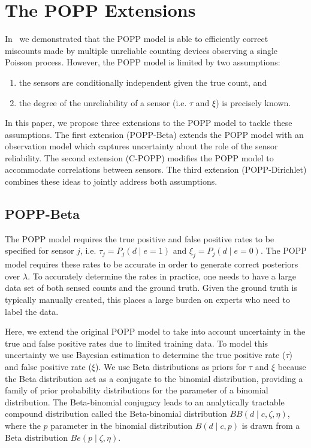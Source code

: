 
\section{The POPP Extensions}
\label{sec:popp_extensions}

In~\cite{jovan18a} we demonstrated that the POPP model is able to efficiently correct miscounts made by multiple unreliable counting devices observing a single Poisson process. However, the POPP model is limited by two assumptions:
\begin{enumerate}
	\item the sensors are conditionally independent given the true count, and 
	\item the degree of the unreliability of a sensor (i.e. $\tau$ and $\xi$) is precisely known.
\end{enumerate}
In this paper, we propose three extensions to the POPP model to tackle these assumptions. The first extension (POPP-Beta) extends the POPP model with an observation model which captures uncertainty about the role of the sensor reliability. The second extension (C-POPP) modifies the POPP model to accommodate correlations between sensors. The third extension (POPP-Dirichlet) combines these ideas to jointly address both assumptions. 

\subsection{POPP-Beta}
\label{subsec:popb}

The POPP model requires the true positive and false positive rates to be specified for sensor $j$, i.e.  $\tau_j = P_j(d \mid e{=}1)$ and $\xi_j = P_j(d \mid e{=}0)$. 
The POPP model requires these rates to be accurate in order to generate correct posteriors over $\lambda$. To accurately determine the rates in practice, one needs to have a large data set of both sensed counts and the ground truth. Given the ground truth is typically manually created, this places a large burden on experts who need to label the data.   

Here, we extend the original POPP model to take into account uncertainty in the true and false positive rates due to limited training data.
% 
To model this uncertainty we use Bayesian estimation to determine the 
true positive rate ($\tau$) and false positive rate ($\xi$).
% 
We use Beta distributions as priors for $\tau$ and $\xi$ because the Beta distribution act as a conjugate to the binomial distribution, providing a family of prior probability distributions for the parameter of a binomial distribution. The Beta-binomial conjugacy leads to an analytically tractable compound distribution called the Beta-binomial distribution $BB(d \mid c, \zeta, \eta)$, where the $p$ parameter in the binomial distribution $B(d \mid c, p)$ is drawn from a Beta distribution $Be(p \mid \zeta, \eta)$.


